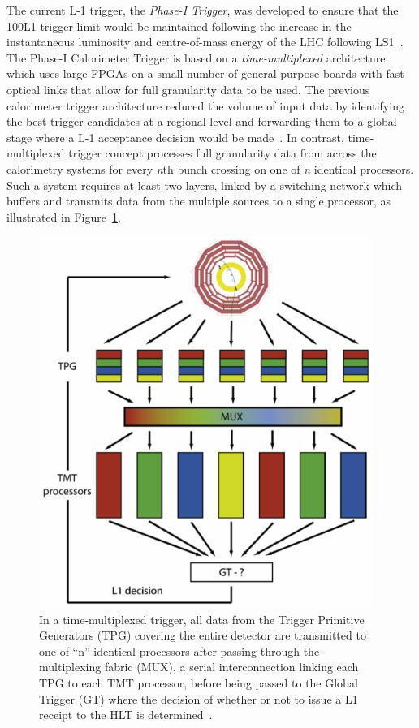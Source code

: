 The current L-1 trigger, the \emph{Phase-I Trigger}, was developed to ensure that the 100\kHz L1 trigger limit would be maintained following the increase in the instantaneous luminosity and centre-of-mass energy of the LHC following LS1~\cite{phase1L1TDR}.
The Phase-I Calorimeter Trigger is based on a \emph{time-multiplexed} architecture which uses large FPGAs on a small number of general-purpose boards with fast optical links that allow for full granularity data to be used.
The previous calorimeter trigger architecture reduced the volume of input data by identifying the best trigger candidates at a regional level and forwarding them to a global stage where a L-1 acceptance decision would be made~\cite{phase1L1TDR}.
In contrast, time-multiplexed trigger concept processes full granularity data from across the calorimetry systems for every \emph{n}th bunch crossing on one of \emph{n} identical processors.
Such a system requires at least two layers, linked by a switching network which buffers and transmits data from the multiple sources to a single processor, as illustrated in Figure~\ref{fig:TMT}.

\begin{figure}[htbp]
\begin{center}
\includegraphics[width=0.97\textwidth]{figs/cms/TMT.pdf}
\caption{In a time-multiplexed trigger, all data from the Trigger Primitive Generators (TPG) covering the entire detector are transmitted to one of ``n'' identical processors after passing through the multiplexing fabric (MUX), a serial interconnection linking each TPG to each TMT processor, before being passed to the Global Trigger (GT) where the decision of whether or not to issue a L1 receipt to the HLT is determined~\cite{tmttelba}.}
\label{fig:TMT}
\end{center}
\end{figure}

